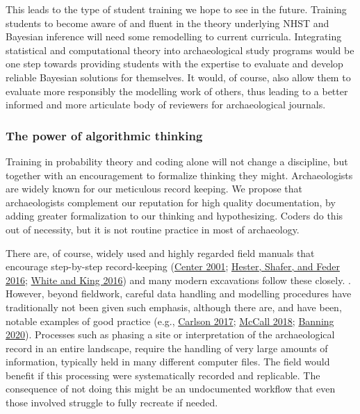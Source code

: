 \documentclass[
]{article}
\begin{document}
This leads to the type of student training we hope to see in the future.
Training students to become aware of and fluent in the theory underlying
NHST and Bayesian inference will need some remodelling to current
curricula. Integrating statistical and computational theory into
archaeological study programs would be one step towards providing
students with the expertise to evaluate and develop reliable Bayesian
solutions for themselves. It would, of course, also allow them to
evaluate more responsibly the modelling work of others, thus leading to
a better informed and more articulate body of reviewers for
archaeological journals.

\hypertarget{the-power-of-algorithmic-thinking}{%
\subsubsection{The power of algorithmic
thinking}\label{the-power-of-algorithmic-thinking}}

Training in probability theory and coding alone will not change a
discipline, but together with an encouragement to formalize thinking
they might. Archaeologists are widely known for our meticulous record
keeping. We propose that archaeologists complement our reputation for
high quality documentation, by adding greater formalization to our
thinking and hypothesizing. Coders do this out of necessity, but it is
not routine practice in most of archaeology.

There are, of course, widely used and highly regarded field manuals that
encourage step-by-step record-keeping
(\protect\hyperlink{ref-crow_crow_2001}{Center 2001};
\protect\hyperlink{ref-hester_field_2016}{Hester, Shafer, and Feder
2016}; \protect\hyperlink{ref-white_archaeological_2016}{White and King
2016}) and many modern excavations follow these closely. . However,
beyond fieldwork, careful data handling and modelling procedures have
traditionally not been given such emphasis, although there are, and have
been, notable examples of good practice (e.g.,
\protect\hyperlink{ref-carlson_quantitative_2017}{Carlson 2017};
\protect\hyperlink{ref-mccall_strategies_2018}{McCall 2018};
\protect\hyperlink{ref-banning_archaeologists_2020}{Banning 2020}).
Processes such as phasing a site or interpretation of the archaeological
record in an entire landscape, require the handling of very large
amounts of information, typically held in many different computer files.
The field would benefit if this processing were systematically recorded
and replicable. The consequence of not doing this might be an
undocumented workflow that even those involved struggle to fully
recreate if needed.
\end{document}
